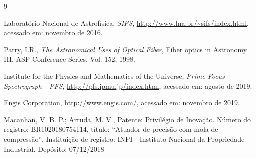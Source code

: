 \begin{thebibliography}{9}


  Laboratório Nacional de Astrofísica,
  \emph{SIFS},
  \url{http://www.lna.br/~sifs/index.html},
  acessado em: novembro de 2016.
  
	Parry, I.R.,
	\emph{The Astronomical Uses of Optical Fiber},
	Fiber optics in Astronomy III, 
	ASP Conference Series, Vol. 152,
	1998.

	Institute for the Physics and Mathematics of the Universe,
  	\emph{Prime Focus Spectrograph - PFS},
  	\url{http://pfs.ipmu.jp/index.html},
  acessado em: agosto de 2019.
  
	Engis Corporation,
	\url{http://www.engis.com/},
  acessado em: novembro de 2019.
  
	 Macanhan, V. B. P.; Arruda, M. V.,
	 Patente: Privilégio de Inovação. 
	 Número do registro: BR1020180754114, 
	 título: ``Atuador de precisão com mola de compressão'', 	
	 Instituição de registro: INPI - Instituto Nacional da Propriedade Industrial. 
	 Depósito: 07/12/2018
  

\end{thebibliography}